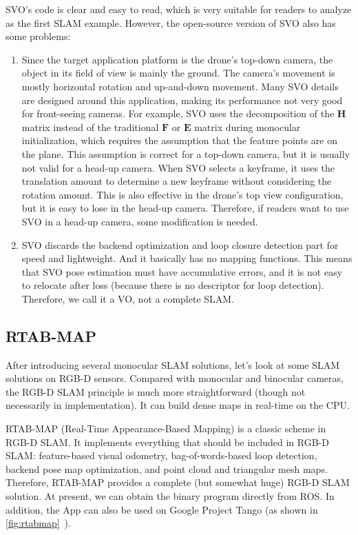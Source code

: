 SVO's code is clear and easy to read, which is very suitable for readers to analyze as the first SLAM example. However, the open-source version of SVO also has some problems:
\begin{enumerate}
	\item Since the target application platform is the drone's top-down camera, the object in its field of view is mainly the ground. The camera's movement is mostly horizontal rotation and up-and-down movement. Many SVO details are designed around this application, making its performance not very good for front-seeing cameras. For example, SVO uses the decomposition of the $\mathbf{H}$ matrix instead of the traditional $\mathbf{F}$ or $\mathbf{E}$ matrix during monocular initialization, which requires the assumption that the feature points are on the plane. This assumption is correct for a top-down camera, but it is usually not valid for a head-up camera. When SVO selects a keyframe, it uses the translation amount to determine a new keyframe without considering the rotation amount. This is also effective in the drone's top view configuration, but it is easy to lose in the head-up camera. Therefore, if readers want to use SVO in a head-up camera, some modification is needed.
	\item SVO discards the backend optimization and loop closure detection part for speed and lightweight. And it basically has no mapping functions. This means that SVO pose estimation must have accumulative errors, and it is not easy to relocate after loss (because there is no descriptor for loop detection). Therefore, we call it a VO, not a complete SLAM.
\end{enumerate}

\subsection{RTAB-MAP}
After introducing several monocular SLAM solutions, let's look at some SLAM solutions on RGB-D sensors. Compared with monocular and binocular cameras, the RGB-D SLAM principle is much more straightforward (though not necessarily in implementation). It can build dense maps in real-time on the CPU.

RTAB-MAP (Real-Time Appearance-Based Mapping) {\cite{Labbe2014}} is a classic scheme in RGB-D SLAM. It implements everything that should be included in RGB-D SLAM: feature-based visual odometry, bag-of-words-based loop detection, backend pose map optimization, and point cloud and triangular mesh maps. Therefore, RTAB-MAP provides a complete (but somewhat huge) RGB-D SLAM solution. At present, we can obtain the binary program directly from ROS. In addition, the App can also be used on Google Project Tango (as shown in \autoref{fig:rtabmap}~).

